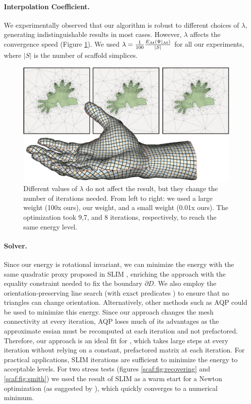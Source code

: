 \paragraph{Interpolation Coefficient.}
We experimentally observed that our algorithm is robust to different choices of $\lambda$, generating indistinguishable results in most cases. However, $\lambda$ affects the convergence speed (Figure \ref{scaf:fig:different_weight}). We used $\lambda = \frac{1}{100}\frac{ E_{\operatorname{\mathcal{M}}}(\Psi|_{\operatorname{\mathcal{M}}})}{|S|}$ for all our experiments, where $|S|$ is the number of scaffold simplices.

\begin{figure}[h!]
\centering
    \includegraphics[width = \columnwidth]{scaf-tex/figs/hand_weight}
\caption{Different values of $\lambda$ do not affect the result, but they change the number of iterations needed. From left to right: we used a large weight (100x ours), our weight, and a small weight (0.01x ours). The optimization took 9,7, and 8 iterations, respectively, to reach the same energy level.}
\label{scaf:fig:different_weight}
\end{figure}

\paragraph{Solver.}
Since our energy is rotational invariant, we can minimize the energy with the same quadratic proxy proposed in SLIM \cite{Rabinovich:2017}, enriching the approach with the equality constraint needed to fix the boundary $\partial D$. We also employ the orientation-preserving line search \cite{Smith:2015} (with exact predicates \cite{Shewchuk:1996}) to ensure that no triangles can change orientation. Alternatively, other methods such as AQP \cite{Kovalsky:2016} could be used to minimize this energy. Since our approach changes the mesh connectivity at every iteration, AQP loses much of its advantages as the approximate essian must be recomputed at each iteration and not prefactored.  Therefore, our approach is an ideal fit for \cite{Rabinovich:2017}, which takes large steps at every iteration without relying on a constant, prefactored matrix at each iteration. For practical applications, SLIM iterations are sufficient to minimize the energy to acceptable levels. For two  stress tests (figures \ref{scaf:fig:recovering} and \ref{scaf:fig:smith}) we used the result of SLIM as a warm start for a Newton optimization (as suggested by \cite{Rabinovich:2017}), which quickly converges to a numerical minimum.

